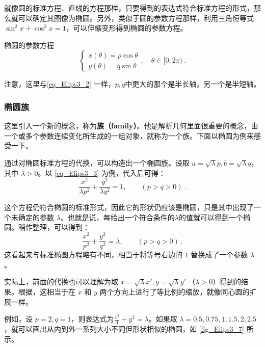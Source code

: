 就像圆的标准方程、直线的方程那样，只要得到的表达式符合标准方程的形式，那么就可以确定其图像为椭圆。另外，类似于圆的参数方程那样，利用三角恒等式$\sin^2x+\cos^2x=1$，可以伸缩变形得到椭圆的参数方程。

\begin{theorem}{椭圆的参数方程}
\begin{equation}\label{eq_Elips3_1}
\begin{cases}
x(\theta) = p\cos \theta\\
y(\theta) = q\sin \theta
\end{cases},\quad \theta \in [0, 2\pi) ~.
\end{equation}
\end{theorem}
注意，这里与\autoref{eq_Elips3_2} 一样，$p,q$中更大的那个是半长轴，另一个是半短轴。

\subsubsection{椭圆族}

这里引入一个新的概念，称为\textbf{族（family）}。他是解析几何里面很重要的概念，由一个或多个参数连续变化所生成的一组对象，就称为一个族。下面以椭圆为例来感受一下。

通过对椭圆标准方程的代换，可以构造出一个椭圆族。设取 $a = \sqrt{\lambda} p,b = \sqrt{\lambda} q$，其中 $\lambda >0$。以 \autoref{eq_Elips3_3} 为例，代入后可得：
\begin{equation}
\frac{x^2}{\lambda p^2} + \frac{y^2}{\lambda q^2} = 1,\qquad(p>q>0)~.
\end{equation}

这个方程仍符合椭圆的标准形式，因此它的形状仍应该是椭圆，只是其中出现了一个未确定的参数 $\lambda$。也就是说，每给出一个符合条件的$\lambda$的值就可以得到一个椭圆。稍作整理，可以得到：
\begin{equation}\label{eq_Elips3_10}
\frac{x^2}{p^2} + \frac{y^2}{q^2} = \lambda,\qquad(p>q>0)~.
\end{equation}
这看起来与标准椭圆方程略有不同，相当于将等号右边的 $1$ 替换成了一个参数 $\lambda$。

实际上，前面的代换也可以理解为取 $x = \sqrt{\lambda} x',y = \sqrt{\lambda} y'$ （$\lambda>0$）得到的结果。根据，这相当于在 $x$ 和 $y$ 两个方向上进行了等比例的缩放，就像同心圆的扩展一样。

例如，设 $p = 2,q = 1$，则表达式为$\displaystyle\frac{x^2}{4} + y^2 = \lambda$。如果取 $\lambda = 0.5, 0.75, 1, 1.5, 2, 2.5$，就可以画出从内到外一系列大小不同但形状相似的椭圆，如 \autoref{fig_Elips3_7} 所示。

